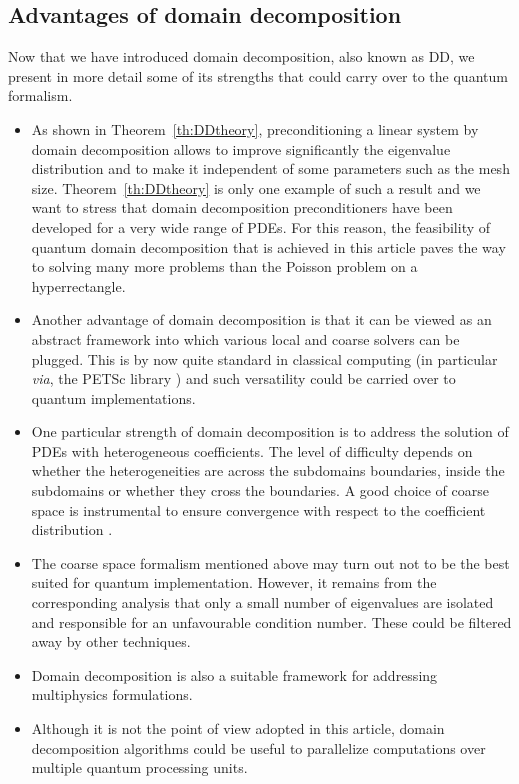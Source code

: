 \documentclass[onefignum,onetabnum]{siamart251216}
\begin{document}
\subsection{Advantages of domain decomposition}
\label{sec:DD-adv}
Now that we have introduced domain decomposition, also known as DD, we present in more detail some of its strengths that could carry over to the quantum formalism.

\begin{itemize}
    \item As shown in Theorem~\ref{th:DDtheory}, preconditioning a linear system by domain decomposition allows to improve significantly the eigenvalue distribution and to make it independent of some parameters such as the mesh size. Theorem~\ref{th:DDtheory} is only one example of such a result and we want to stress that domain decomposition preconditioners have been developed for a very wide range of PDEs. For this reason, the feasibility of quantum domain decomposition that is achieved in this article paves the way to solving many more problems than the Poisson problem on a hyperrectangle. 
    \item Another advantage of domain decomposition is that it can be viewed as an abstract framework into which various local and coarse solvers can be plugged. This is by now quite standard in classical computing (in particular \textit{via}, the PETSc library \cite{petsc-user-ref}) and such versatility could be carried over to quantum implementations. 
    \item One particular strength of domain decomposition is to address the solution of PDEs with heterogeneous coefficients. The level of difficulty depends on whether the heterogeneities are across the subdomains boundaries, inside the subdomains or whether they cross the boundaries. A good choice of coarse space is instrumental to ensure convergence with respect to the coefficient distribution \cite{zbMATH05172548,zbMATH01592007,zbMATH05651315,spillane_geneo_2025,zbMATH06303461,zbMATH02113718}. 
    \item The coarse space formalism mentioned above may turn out not to be the best suited for quantum implementation. However, it remains from the corresponding analysis that only a small number of eigenvalues are isolated and responsible for an unfavourable condition number. These could be filtered away by other techniques. 
    \item Domain decomposition is also a suitable framework for addressing multiphysics formulations. 
    \item Although it is not the point of view adopted in this article, domain decomposition algorithms could be useful to parallelize computations over multiple quantum processing units. 

\end{itemize}
\end{document}
